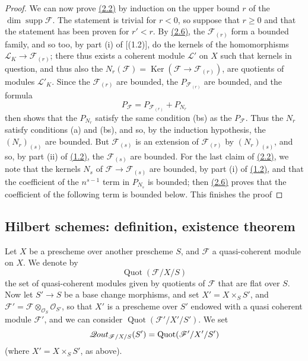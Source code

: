 \documentclass{article}
\newcommand{\oldpage}[1]{\marginpar{\footnotesize$\Big\vert$ \textit{p.~#1}}}
\theoremstyle{definition}
\theoremstyle{definition}
\theoremstyle{definition}
\theoremstyle{definition}
\theoremstyle{remark}
\begin{document}
\begin{proof}
We can now prove \protect\hyperlink{fga-3-iv-theorem-2.2}{(2.2)} by induction on the upper bound \(r\) of the \(\dim\operatorname{supp}{\mathscr{F}}\).
The statement is trivial for \(r<0\), so suppose that \(r\geqslant 0\) and that the statement has been proven for \(r'<r\).
By \protect\hyperlink{fga-3-iv-lemma-2.6}{(2.6)}, the \({\mathscr{F}}_{(r)}\) form a bounded family, and so too, by part (i) of {[}(1.2){]}, do the kernels of the homomorphisms \({\mathscr{L}}_K\to{\mathscr{F}}_{(r)}\);
there thus exists a coherent module \({\mathscr{L}}'\) on \(X\) such that kernels in question, and thus also the \(N_r({\mathscr{F}})=\operatorname{Ker}({\mathscr{F}}\to{\mathscr{F}}_{(r)})\), are quotients of modules \({\mathscr{L}}'_K\).
Since the \({\mathscr{F}}_{(r)}\) are bounded, the \(P_{{\mathscr{F}}_{(r)}}\) are bounded, and the formula
\[
  P_{\mathscr{F}} = P_{{\mathscr{F}}_{(r)}} + P_{N_r}
\]
then shows that the \(P_{N_r}\) satisfy the same condition (bs) as the \(P_{\mathscr{F}}\).
Thus the \(N_r\) satisfy conditions (a) and (bs), and so, by the induction hypothesis, the \((N_r)_{(s)}\) are bounded.
But \({\mathscr{F}}_{(s)}\) is an extension of \({\mathscr{F}}_{(r)}\) by \((N_r)_{(s)}\), and so, by part (ii) of \protect\hyperlink{fga-3-iv-proposition-1.2}{(1.2)}, the \({\mathscr{F}}_{(s)}\) are bounded.
For the last claim of \protect\hyperlink{fga-3-iv-theorem-2.2}{(2.2)}, we note that the kernels \(N_s\) of \({\mathscr{F}}\to{\mathscr{F}}_{(s)}\) are bounded, by part (i) of \protect\hyperlink{fga-3-iv-proposition-1.2}{(1.2)}, and that the coefficient of the \(n^{s-1}\) term in \(P_{N_s}\) is bounded;
then \protect\hyperlink{fga-3-iv-lemma-2.6}{(2.6)} proves that the coefficient of the following term is bounded below.
This finishes the proof
\end{proof}

\hypertarget{fga-3-iv-section-3}{%
\subsection{Hilbert schemes: definition, existence theorem}\label{fga-3-iv-section-3}}

Let \(X\) be a prescheme over another prescheme \(S\), and \({\mathscr{F}}\) a quasi-coherent module on \(X\).
We denote by
\[
  \operatorname{Quot}({{\mathscr{F}}/X/S})
\]
the set of quasi-coherent modules given by quotients of \({\mathscr{F}}\) that are flat over \(S\).
Now let \(S'\to S\) be a base change morphisms, and set \(X'=X\times_S S'\), and \({\mathscr{F}}'={\mathscr{F}}\otimes_{{\mathscr{O}}_S}{\mathscr{O}}_{S'}\), so that \(X'\) is a prescheme over \(S'\) endowed with a quasi coherent module \({\mathscr{F}}'\), and we can consider \(\operatorname{Quot}({{\mathscr{F}}'/X'/S'})\).
\oldpage{221-11}We set
\[
  \mathscr{Q}\kern -.5pt out_{{{\mathscr{F}}/X/S}}(S') = \operatorname{Quot}({{\mathscr{F}}'/X'/S'})
\]
(where \(X'=X\times_S S'\), as above).
\end{document}

